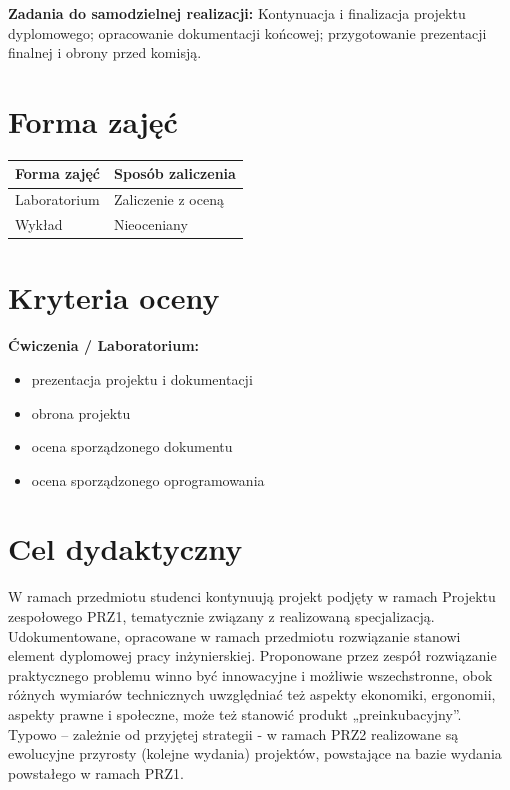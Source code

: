 \documentclass[12pt, a4paper]{article}
\newcommand{\thdrule}{\noalign{\global\setlength{\extrarowheight}{0pt}}}
\newcommand{\thdend}{\noalign{\global\setlength{\extrarowheight}{3pt}}}
\begin{document}
\vspace{4pt}
\noindent\textbf{Zadania do samodzielnej realizacji:} Kontynuacja i finalizacja projektu dyplomowego; opracowanie dokumentacji końcowej; przygotowanie prezentacji finalnej i obrony przed komisją.

\section{Forma zajęć}

\begin{center}
{\scriptsize
\begin{tabular}{m{5cm}m{8cm}}
\thdrule\toprule
\rowcolor{pjatkRed} {\color{white}\textbf{Forma zajęć}} & {\color{white}\textbf{Sposób zaliczenia}} \\
\midrule\thdend
  \rowcolor{tableRowLight} Laboratorium & Zaliczenie z oceną \\
  \rowcolor{tableRowAlt} Wykład & Nieoceniany \\
\bottomrule
\end{tabular}}
\end{center}

\section{Kryteria oceny}

\textbf{Ćwiczenia / Laboratorium:}
\begin{itemize}
  \item prezentacja projektu i dokumentacji
  \item obrona projektu
  \item ocena sporządzonego dokumentu
  \item ocena sporządzonego oprogramowania
\end{itemize}


\section{Cel dydaktyczny}

W ramach przedmiotu studenci kontynuują projekt podjęty w ramach Projektu zespołowego PRZ1, tematycznie związany z realizowaną specjalizacją. Udokumentowane, opracowane w ramach przedmiotu rozwiązanie stanowi element dyplomowej pracy inżynierskiej. Proponowane przez zespół rozwiązanie praktycznego problemu winno być innowacyjne i możliwie wszechstronne, obok różnych wymiarów technicznych uwzględniać też aspekty ekonomiki, ergonomii, aspekty prawne i społeczne, może też stanowić produkt „preinkubacyjny”. Typowo – zależnie od przyjętej strategii -  w ramach PRZ2 realizowane są ewolucyjne przyrosty (kolejne wydania) projektów, powstające na bazie wydania powstałego w ramach PRZ1.
\end{document}
